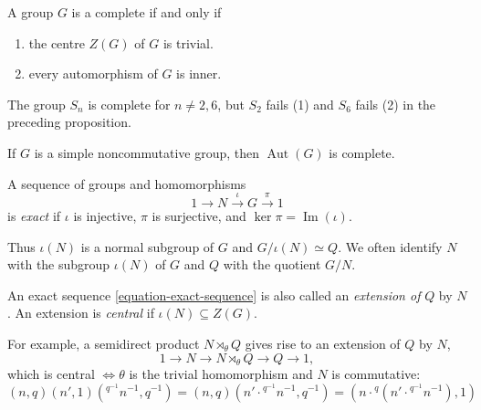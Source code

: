 \begin{proposition}
  \label{proposition-complete-characteristic}
  A group \( G \) is a complete if and only if
  \begin{enumerate}
    \item the centre \( Z(G) \) of \( G \) is trivial.
    \item every automorphism of \( G \) is inner.
  \end{enumerate}
\end{proposition}

\begin{example}
  \label{example-complete-symmetric-group}
  The group \( S_n \) is complete for \( n \neq 2, 6 \), but \( S_2 \) fails (1) and \( S_6 \) fails (2) in the preceding proposition.
\end{example}

\begin{example}
  \label{example-simple-noncommutative-group-complete}
  If \( G \) is a simple noncommutative group, then \( \operatorname{Aut}(G) \) is complete.
\end{example}


\begin{definition}
  \label{definition-exact-sequence}
  A sequence of groups and homomorphisms
  \begin{equation}
    1 \to N \xrightarrow{\iota} G \xrightarrow{\pi} 1
    \label{equation-exact-sequence}
  \end{equation}
  is \emph{exact} if \( \iota \) is injective, \( \pi \) is surjective, and \( \ker \pi = \operatorname{Im}(\iota) \).
\end{definition}
Thus \( \iota(N) \) is a normal subgroup of \( G \) and \( G / \iota(N) \simeq Q \).
We often identify \( N \) with the subgroup \( \iota(N) \) of \( G \) and \( Q \) with the quotient \( G / N \).

\begin{definition}
  \label{definition-extension}
  \label{definition-central}
  An exact sequence \ref{equation-exact-sequence} is also called an \emph{extension of} \( Q \) by \( N \).
  An extension is \emph{central} if \( \iota(N) \subseteq Z(G) \).
\end{definition}
For example, a semidirect product \( N \rtimes_\theta Q \) gives rise to an extension of \( Q \) by \( N \),
\[
  1 \to N \to N \rtimes_\theta Q \to Q \to 1,
\]
which is central \( \iff \theta \)  is the trivial homomorphism and \( N \) is commutative:
\[
  (n, q)(n', 1)({}^{q^{-1}}n^{-1}, q^{-1}) = (n, q)(n' \cdot {}^{q^{-1}}n^{-1}, q^{-1}) = (n \cdot {}^q (n' \cdot {}^{q^{-1}}n^{-1}), 1)
\]


